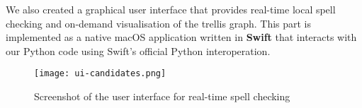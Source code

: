 We also created a graphical user interface that provides real-time local spell checking and on-demand visualisation of 
the trellis graph. This part is implemented as a native macOS application written in \textbf{Swift} that interacts with 
our Python code using Swift's official Python interoperation.

\begin{figure}[H]
	\centering
	\texttt{[image: ui-candidates.png]}
	\caption{Screenshot of the user interface for real-time spell checking}
	\label{fig:noisychannel}
\end{figure}
